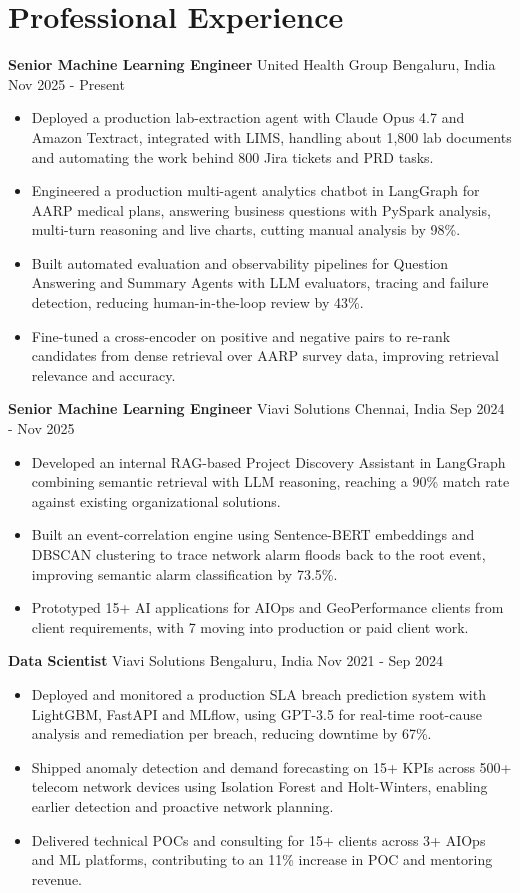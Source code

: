 \documentclass[10pt,a4paper]{article}
\newcommand{\role}[4]{\textbf{#1} \textbar{} #2 \hfill #3 \textbar{} #4\par}
\begin{document}
\section{Professional Experience}
\role{Senior Machine Learning Engineer}{United Health Group}{Bengaluru, India}{Nov 2025 - Present}
\begin{itemize}
  \item Deployed a production lab-extraction agent with Claude Opus 4.7 and Amazon Textract, integrated with LIMS, handling about 1,800 lab documents and automating the work behind 800 Jira tickets and PRD tasks.
  \item Engineered a production multi-agent analytics chatbot in LangGraph for AARP medical plans, answering business questions with PySpark analysis, multi-turn reasoning and live charts, cutting manual analysis by 98\%.
  \item Built automated evaluation and observability pipelines for Question Answering and Summary Agents with LLM evaluators, tracing and failure detection, reducing human-in-the-loop review by 43\%.
  \item Fine-tuned a cross-encoder on positive and negative pairs to re-rank candidates from dense retrieval over AARP survey data, improving retrieval relevance and accuracy.
\end{itemize}
\vspace{3pt}
\role{Senior Machine Learning Engineer}{Viavi Solutions}{Chennai, India}{Sep 2024 - Nov 2025}
\begin{itemize}
  \item Developed an internal RAG-based Project Discovery Assistant in LangGraph combining semantic retrieval with LLM reasoning, reaching a 90\% match rate against existing organizational solutions.
  \item Built an event-correlation engine using Sentence-BERT embeddings and DBSCAN clustering to trace network alarm floods back to the root event, improving semantic alarm classification by 73.5\%.
  \item Prototyped 15+ AI applications for AIOps and GeoPerformance clients from client requirements, with 7 moving into production or paid client work.
\end{itemize}
\vspace{3pt}
\role{Data Scientist}{Viavi Solutions}{Bengaluru, India}{Nov 2021 - Sep 2024}
\begin{itemize}
  \item Deployed and monitored a production SLA breach prediction system with LightGBM, FastAPI and MLflow, using GPT-3.5 for real-time root-cause analysis and remediation per breach, reducing downtime by 67\%.
  \item Shipped anomaly detection and demand forecasting on 15+ KPIs across 500+ telecom network devices using Isolation Forest and Holt-Winters, enabling earlier detection and proactive network planning.
  \item Delivered technical POCs and consulting for 15+ clients across 3+ AIOps and ML platforms, contributing to an 11\% increase in POC and mentoring revenue.
\end{itemize}
\end{document}
